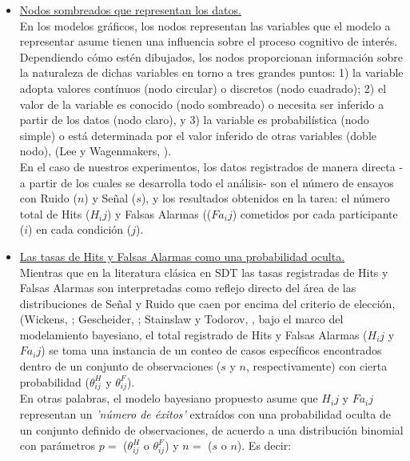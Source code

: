\begin{itemize}
\item \underline{Nodos sombreados que representan los datos.}\\

En los modelos gráficos, los nodos representan las variables que el modelo a representar asume tienen una influencia sobre el proceso cognitivo de interés. Dependiendo cómo estén dibujados, los nodos proporcionan información sobre la naturaleza de dichas variables en torno a tres grandes puntos: 1) la variable adopta valores contínuos (nodo circular) o discretos (nodo cuadrado); 2) el valor de la variable es conocido (nodo sombreado) o necesita ser inferido a partir de los datos (nodo claro), y 3) la variable es probabilística (nodo simple) o está determinada por el valor inferido de otras variables (doble nodo), (Lee y Wagenmakers, \citeyear{LeeBook}).\\

En el caso de nuestros experimentos, los datos registrados de manera directa -a partir de los cuales se desarrolla todo el análisis- son el número de ensayos con Ruido ($n$) y Señal ($s$), y los resultados obtenidos en la tarea: el número total de Hits ($H_ij$) y Falsas Alarmas (($Fa_ij$) cometidos por cada participante ($i$) en cada condición ($j$).\\

\item \underline{Las tasas de Hits y Falsas Alarmas como una probabilidad oculta.}\\ 

Mientras que en la literatura clásica en SDT las tasas registradas de Hits y Falsas Alarmas son interpretadas como reflejo directo del área de las distribuciones de Señal y Ruido que caen por encima del criterio de elección, (Wickens, \citeyear{Wickens1}; Gescheider, \citeyear{Gescheider}; Stainslaw y Todorov, \citeyear{Stainslaw1999}, bajo el marco del modelamiento bayesiano, el total registrado de Hits y Falsas Alarmas ($H_ij$ y $Fa_ij$) se toma una instancia de un conteo de casos específicos encontrados dentro de un conjunto de observaciones ($s$ y $n$, respectivamente) con cierta probabilidad ($\theta^H_{ij}$ y $\theta^F_{ij}$).\\

En otras palabras, el modelo bayesiano propuesto asume que $H_ij$ y $Fa_ij$ representan un \textit{'número de éxitos'} extraídos con una probabilidad oculta de un conjunto definido de observaciones, de acuerdo a una distribución binomial con parámetros $p=$ ($\theta^H_{ij}$ o $\theta^F_{ij}$) y $n=$ ($s$ o $n$). Es decir:\\


\end{itemize}
